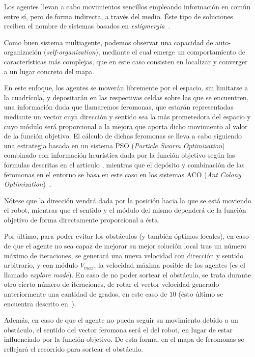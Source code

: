     Los agentes llevan a cabo movimientos sencillos empleando información en común entre sí, pero de forma indirecta, a través del medio. Éste tipo de soluciones reciben el nombre de sistemas basados en \textit{estigmergia}~\cite{stigmergy}.

    Como buen sistema multiagente, podemos observar una capacidad de auto-organización (\textit{self-organization}), mediante el cual emerge un comportamiento de características más complejas, que en este caso consisten en localizar y converger a un lugar concreto del mapa.

    En este enfoque, los agentes se moverán libremente por el espacio, sin limitarse a la cuadrícula, y depositarán en las respectivas celdas sobre las que se encuentren, una información dada que llamaremos feromonas, que estarán representadas mediante un vector cuya dirección y sentido sea la más prometedora del espacio y cuyo módulo será proporcional a la mejora que aporta dicho movimiento al valor de la función objetivo. El cálculo de dichas feromonas se lleva a cabo siguiendo una estrategia basada en un sistema PSO (\textit{Particle Swarm Optimization})~\cite{PSO} combinado con información heurística dada por la función objetivo según las formulas descritas en el articulo \cite{initialPaper}, mientras que el depósito y combinación de las feromonas en el entorno se basa en este caso en los sistemas ACO (\textit{Ant Colony Optimization})~\cite{ACO}.

    Nótese que la dirección vendrá dada por la posición hacia la que se está moviendo el robot, mientras que el sentido y el módulo del mismo dependerá de la función objetivo de forma directamente proporcional a ésta.

    Por último, para poder evitar los obstáculos (y también óptimos locales), en caso de que el agente no sea capaz de mejorar su mejor solución local tras un número máximo de iteraciones, se generará una nueva velocidad con dirección y sentido arbitrario, y con módulo $V_{max}$, la velocidad máxima posible de los agentes (es el llamado \textit{explore mode}). En caso de no poder sortear el obstáculo, se trata durante otro cierto número de iteraciones, de rotar el vector velocidad generado anteriormente una cantidad de grados, en este caso de $10$ (ésto último se encuentra descrito en~\cite{referencedPaper}). 
    
    Además, en caso de que el agente no pueda seguir su movimiento debido a un obstáculo, el sentido del vector feromona será el del robot, en lugar de estar influenciado por la función objetivo. De esta forma, en el mapa de feromonas se reflejará el recorrido para sortear el obstáculo.
    